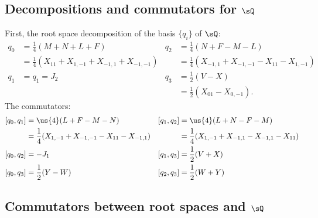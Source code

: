 \subsection{Decompositions and commutators for \texorpdfstring{$\sQ$}{Q}}

First, the root space decomposition of the basis $\{q_i\}$ of $\sQ$:
\begin{subequations}
\begin{align}
	q_0	&=\frac{1}{ 4 }(M+N+L+F)				&	q_2	&=\frac{1}{ 4 }(N+F-M-L)\\
		&=\frac{1}{ 4 }(X_{11}+X_{1,-1}+X_{-1,1}+X_{-1,-1})	&		&=\frac{1}{ 4 }(X_{-1,1}+X_{-1,-1}-X_{11}-X_{1,-1})\\
	q_1	&=q_1=J_2						&	q_3	&=\frac{1}{2}(V-X)\\
		&							&		&=\frac{ 1 }{2}(X_{01}-X_{0,-1}).
\end{align}
\end{subequations}
The commutators:
\begin{subequations}
\begin{align}
[q_0,q_1]&=\us{4}(L+F-M-N) &[q_1,q_2]&=\us{4}(L+N-F-M)\\\
&=\frac{1}{ 4 }(X_{1,-1}+X_{-1,-1}-X_{11}-X_{-1,1})	&&=\frac{1}{ 4 }(X_{1,-1}+X_{-1,1}-X_{-1,1}-X_{11})\\
[q_0,q_2]&=-J_1            &[q_1,q_3]&=\frac{1}{2}(V+X)\\
[q_0,q_3]&=\frac{1}{2}(Y-W)      &[q_2,q_3]&=\frac{1}{2}(W+Y)
\end{align}
\end{subequations}

\subsection{Commutators between root spaces and \texorpdfstring{$\sQ$}{Q}}

